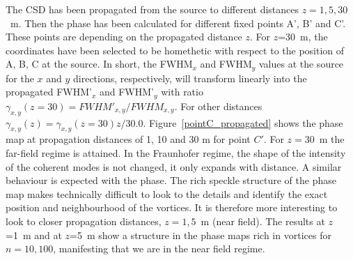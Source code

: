 \documentclass{iucr}              %
\begin{document}
The CSD has been propagated from the source to different distances $z=1,5,30$~m. Then the phase has been calculated for different fixed points A', B' and C'. These points are depending on the propagated distance $z$. For $z$=30~m, the coordinates have been selected to be homethetic with respect to the position of A, B, C at the source. In short, the FWHM$_x$ and FWHM$_y$ values at the source for the $x$ and $y$ directions, respectively, will transform linearly into the propagated FWHM'$_x$ and FWHM'$_y$ with ratio $\gamma_{x,y}(z=30)=FWHM'_{x,y}/FWHM_{x,y}$.
For other distances $\gamma_{x,y}(z)= \gamma_{x,y}(z=30) z / 30.0$. Figure~\ref{pointC_propagated} shows the phase map at propagation distances of 1, 10 and 30 m for point $C'$. For $z=$30~m the far-field regime is attained. In the Fraunhofer regime, the shape of the intensity of the coherent modes is not changed, it only expands with distance. A similar behaviour is expected with the phase. The rich speckle structure of the phase map makes technically difficult to look to the details and identify the exact position and neighbourhood of the vortices. It is therefore more interesting to look to closer propagation distances, $z=1,5$~m (near field). 
The results at $z$=1~m and at $z$=5~m show a structure in the phase maps rich in vortices for $n=10,100$, manifesting that we are in the near field regime.   
\end{document}
